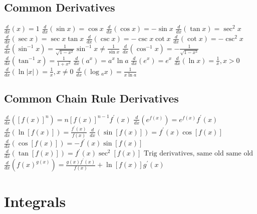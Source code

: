 \documentclass[10pt,landscape,letterpaper]{cheatsheet}
\begin{document}
\subsection*{Common Derivatives}
$ \frac{d}{dx}(x)=1                                                                                      $
$ \frac{d}{dx}(\sin {x})=\cos {x}                                                                        $
$ \frac{d}{dx}(\cos {x})=-\sin {x}                                                                       $
$ \frac{d}{dx}(\tan {x})=\sec ^{2} {x}                                                                   $
$ \frac{d}{dx}(\sec {x})=\sec {x} \tan {x}                                                               $
$ \frac{d}{dx}(\csc {x})=-\csc {x} \cot {x}                                                              $
$ \frac{d}{dx}(\cot {x})=-\csc ^2 {x}                                                                    $
$ \frac{d}{dx}(\sin ^{-1} {x})=\frac{1}{\sqrt{1-x^2}} \sin^{-1} {x} \neq \frac{1}{\sin {x}} $
$ \frac{d}{dx}(\cos ^{-1} {x})=-\frac{1}{\sqrt{1-x^2}}                                                   $
$ \frac{d}{dx}(\tan ^{-1} {x})=\frac{1}{1+x^2}                                                           $
$ \frac{d}{dx}(a ^ {x})=a^{x} \ln {a}                                                                    $
$ \frac{d}{dx}(e ^ {x})=e^{x}                                                                            $
$ \frac{d}{dx}(\ln {x})=\frac{1}{x}, x > 0                                                               $
$ \frac{d}{dx}(\ln {|x|})=\frac{1}{x}, x \neq 0                                                          $
$ \frac{d}{dx}(\log {_a}{x})=\frac{1}{x \ln {a}}                                                         $

\subsection*{Common Chain Rule Derivatives}
$ \frac{d}{dx}([f(x)]^n)=n[f(x)]^{n-1}f^{\prime}(x) $
$ \frac{d}{dx}(e^{f(x)})=e^{f(x)}f^{\prime}(x)      $
$ \frac{d}{dx}(\ln [{f(x)}])=\frac{f^{\prime}(x)}{f(x)}      $
$ \frac{d}{dx}(\sin [{f(x)}])=f^{\prime}(x)\cos[{f(x)}]    $
$ \frac{d}{dx}(\cos [{f(x)}])=-f^{\prime}(x)\sin[{f(x)}]    $
$ \frac{d}{dx}(\tan [{f(x)}])=f^{\prime}(x)\sec ^{2}[{f(x)}]    $
$ \text{Trig derivatives, same old same old}$
$ \frac{d}{dx}(f(x)^{g(x)})=\frac{g(x)f^{\prime}(x)}{f(x)}+\ln{[f(x)]}g^{\prime}(x)   $
\section*{Integrals}
\end{document}
